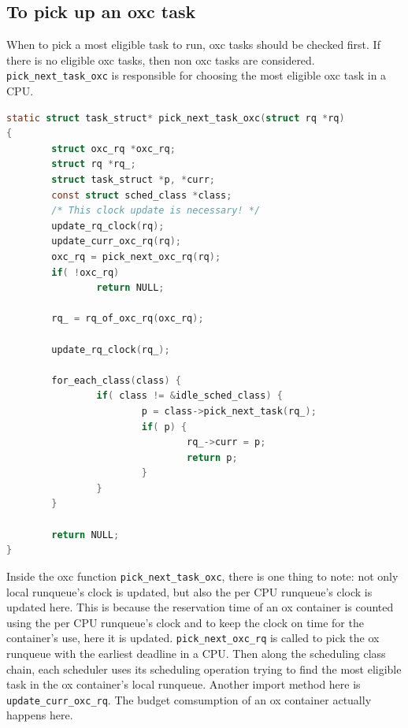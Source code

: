 \subsection{To pick up an oxc task}
When to pick a most eligible task to run, oxc tasks should be checked first.
If there is no eligible oxc tasks, then non oxc tasks are considered.
\texttt{pick\_next\_task\_oxc} is responsible for choosing the most 
eligible oxc task in a CPU.
\begin{lstlisting}[language=C, label={list:pick_next},
		caption={Pick up the most eligible oxc task}]
static struct task_struct* pick_next_task_oxc(struct rq *rq)
{
        struct oxc_rq *oxc_rq;
        struct rq *rq_;
        struct task_struct *p, *curr;
        const struct sched_class *class;
        /* This clock update is necessary! */
        update_rq_clock(rq);
        update_curr_oxc_rq(rq);
        oxc_rq = pick_next_oxc_rq(rq);
        if( !oxc_rq)
                return NULL;

        rq_ = rq_of_oxc_rq(oxc_rq);

        update_rq_clock(rq_);

        for_each_class(class) {
                if( class != &idle_sched_class) {
                        p = class->pick_next_task(rq_);
                        if( p) {
                                rq_->curr = p;
                                return p;
                        }
                }
        }

        return NULL;
}
\end{lstlisting}
Inside the oxc function \texttt{pick\_next\_task\_oxc},
there is one thing to note: not only local runqueue's clock
is updated, but also the per CPU runqueue's clock is updated here.
This is because the reservation time of an ox container is counted
using the per CPU runqueue's clock and to keep the clock on time
for the container's use, here it is updated. 
\texttt{pick\_next\_oxc\_rq} is called to pick the ox runqueue with the 
earliest deadline in a CPU. Then along the scheduling class chain, each
scheduler uses its scheduling operation trying to find the most eligible
task in the ox container's local runqueue.
Another import method here is \texttt{update\_curr\_oxc\_rq}.
The budget comsumption of an ox container actually happens here.
